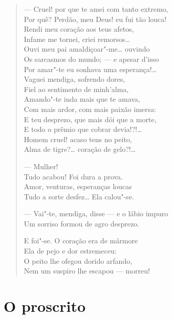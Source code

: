 \begin{verse}
--- Cruel! por que te amei com tanto extremo,\\
Por quê? Perdão, meu Deus! eu fui tão louca!\\
Rendi meu coração aos teus afetos,\\
Infame me tornei, criei remorsos\ldots{}\\
Ouvi meu pai amaldiçoar"-me\ldots{} ouvindo\\
Os sarcasmos do mundo; --- e apesar d'isso\\
Por amar"-te eu sonhava uma esperança!\ldots{}\\
Vaguei mendiga, sofrendo dores,\\
Fiel ao sentimento de minh'alma,\\
Amando"-te inda mais que te amava,\\
Com mais ardor, com mais paixão imersa:\\
E teu desprezo, que mais dói que a morte,\\
E todo o prêmio que cobrar devia!?!\ldots{}\\
Homem cruel! acaso tens no peito,\\
Alma de tigre?\ldots{} coração de gelo?!\ldots{}

--- Mulher!\\
Tudo acabou! Foi dura a prova.\\
Amor, venturas, esperanças loucas\\
Tudo a sorte desfez\ldots{} Ela calou"-se.

--- Vai"-te, mendiga, disse --- e o lábio impuro\\
Um sorriso formou de agro desprezo.

E foi"-se. O coração era de mármore\\
Ela de pejo e dor estremeceu:\\
O peito lhe ofegou dorido arfando,\\
Nem um suspiro lhe escapou --- morreu!
\end{verse}

\chapter{O proscrito}


